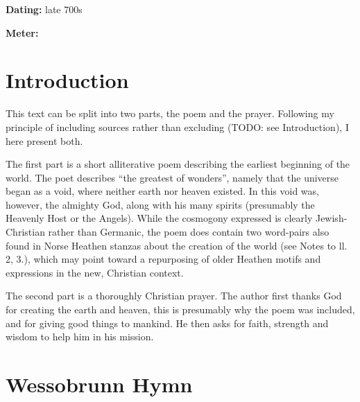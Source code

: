 
\begin{flushright}%
\textbf{Dating:} late 700s

\textbf{Meter:} \Fornyrdislag%
\end{flushright}%

\section{Introduction}

This text can be split into two parts, the poem and the prayer. Following my principle of including sources rather than excluding (TODO: see Introduction), I here present both.

The first part is a short alliterative poem describing the earliest beginning of the world. The poet describes “the greatest of wonders”, namely that the universe began as a void, where neither earth nor heaven existed. In this void was, however, the almighty God, along with his many spirits (presumably the Heavenly Host or the Angels). While the cosmogony expressed is clearly Jewish-Christian rather than Germanic, the poem does contain two word-pairs also found in Norse Heathen stanzas about the creation of the world (see Notes to ll. 2, 3.), which may point toward a repurposing of older Heathen motifs and expressions in the new, Christian context.

The second part is a thoroughly Christian prayer. The author first thanks God for creating the earth and heaven, this is presumably why the poem was included, and for giving good things to mankind. He then asks for faith, strength and wisdom to help him in his mission.

\sectionline

\section{Wessobrunn Hymn}

